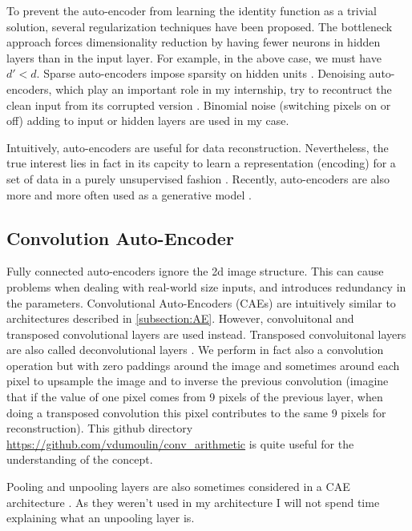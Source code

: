 To prevent the auto-encoder from learning the identity function as
a trivial solution, several regularization techniques have been proposed.
The bottleneck approach forces dimensionality reduction by having
fewer neurons in hidden layers than in the input layer. For example,
in the above case, we must have $d'<d$. Sparse auto-encoders impose sparsity
on hidden units \cite{A. Makhzani 2014}.
Denoising auto-encoders, which play an important role in my internship,
try to recontruct the clean input from its corrupted version
\cite{P. Vincent 2008, Y. Bengio 2012}. Binomial noise
(switching pixels on or off) adding
to input or hidden layers are used in my case.

Intuitively, auto-encoders are useful for data reconstruction.
Nevertheless, the true interest lies in fact in its capcity to learn
a representation (encoding) for a set of data in a purely unsupervised
fashion \cite{P. Vincent 2010}. Recently, auto-encoders are also
more and more often used as a generative model \cite{Y. Bengio 2013}.

\subsection{Convolution Auto-Encoder}

Fully connected auto-encoders ignore the 2d image structure.
This can cause problems when dealing with real-world size inputs,
and introduces redundancy in the parameters.
Convolutional Auto-Encoders \cite{J. Masci 2011, V. Turchenko 2017}
(CAEs) are intuitively similar
to architectures described in \ref{subsection:AE}.
However, convoluitonal and transposed convolutional layers are used instead.
Transposed convoluitonal layers are also called deconvolutional
layers \cite{M. D. Zeiler 2011}.
We perform in fact also a convolution operation but with zero paddings
around the image and sometimes around each pixel to upsample the
image and to inverse the previous convolution
(imagine that if the value of one pixel comes from 9 pixels of the
previous layer, when doing a transposed convolution this pixel
contributes to the same 9 pixels for reconstruction).
This github directory
\href{https://github.com/vdumoulin/conv_arithmetic}
{https://github.com/vdumoulin/conv\_arithmetic}
is quite useful for the understanding of the concept.

Pooling and unpooling layers are also sometimes considered in a CAE
architecture \cite{V. Turchenko 2017}. As they weren't used
in my architecture I will not spend time explaining what an unpooling
layer is.

